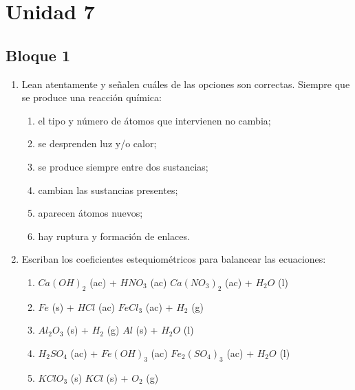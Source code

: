 \documentclass[../Práctica.root.tex]{subfiles}
\begin{document}
\section{Unidad 7}
\subsection{Bloque 1}
\begin{enumerate}
    \item Lean atentamente y señalen cuáles de las opciones son correctas.
          Siempre que se produce una reacción química:
          \begin{enumerate}
              \item el tipo y número de átomos que intervienen no cambia;
              \item se desprenden luz y/o calor;
              \item se produce siempre entre dos sustancias;
              \item cambian las sustancias presentes;
              \item aparecen átomos nuevos;
              \item hay ruptura y formación de enlaces.
          \end{enumerate}

    \item Escriban los coeficientes estequiométricos para balancear las ecuaciones:
          \begin{enumerate}
              \item $Ca(OH)_2$ (ac) + $HNO_3$ (ac) \to $Ca(NO_3)_2$ (ac) + $H_2O$ (l)
              \item $Fe$ (s) + $HCl$ (ac) \to $FeCl_3$ (ac) + $H_2$ (g)
              \item $Al_2O_3$ (s) + $H_2$ (g) \to $Al$ (s) + $H_2O$ (l)
              \item $H_2SO_4$ (ac) + $Fe(OH)_3$ (ac) \to $Fe_2(SO_4)_3$ (ac) + $H_2O$ (l)
              \item $KClO_3$ (s) \to $KCl$ (s) + $O_2$ (g)
          \end{enumerate}


\end{enumerate}
\end{document}
